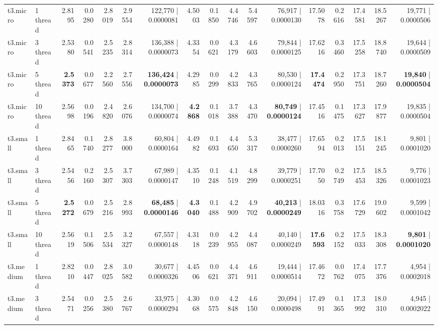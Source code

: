 \documentclass[conference]{IEEEtran}
\begin{document}
\begin{table}[h]
{\begin{tabular}{ll|rrrrr|rrrrr|rrrrr}
			\midrule
			t3.micro & 1 thread & 2.8195 & 0.0280 & 2.8019 & 2.9554 & 122,770 | 0.0000081 & 4.5003 & 0.1850 & 4.4746 & 5.4597 & 76,917 | 0.0000130 & 17.5078 & 0.2616 & 17.4581 & 18.5267 & 19,771 | 0.0000506 \\
			t3.micro & 3 thread & 2.5380 & 0.0541 & 2.5235 & 2.8314 & 136,388 | 0.0000073 & 4.3354 & 0.0621 & 4.3179 & 4.6603 & 79,844 | 0.0000125 & 17.6216 & 0.3460 & 17.5258 & 18.8740 & 19,644 | 0.0000509 \\
			t3.micro & 5 thread & \textbf{2.5373} & 0.0677 & 2.2560 & 2.7556 & \textbf{136,424} | \textbf{0.0000073} & 4.2985 & 0.0299 & 4.2833 & 4.3765 & 80,530 | 0.0000124 & \textbf{17.4474} & 0.2950 & 17.3751 & 18.7260 & \textbf{19,840} | \textbf{0.0000504} \\
			t3.micro & 10 thread & 2.5698 & 0.0196 & 2.4820 & 2.6076 & 134,700 | 0.0000074 & \textbf{4.2868} & 0.1018 & 3.7388 & 4.3470 & \textbf{80,749} | \textbf{0.0000124} & 17.4516 & 0.1475 & 17.3627 & 17.9877 & 19,835 | 0.0000504 \\
			\midrule
			t3.small & 1 thread & 2.8465 & 0.1740 & 2.8277 & 3.8000 & 60,804 | 0.0000164 & 4.4982 & 0.1693 & 4.4650 & 5.3317 & 38,477 | 0.0000260 & 17.6594 & 0.2013 & 17.5151 & 18.1245 & 9,801 | 0.0001020 \\
			t3.small & 3 thread & 2.5456 & 0.2160 & 2.5307 & 3.7303 & 67,989 | 0.0000147 & 4.3510 & 0.1248 & 4.1519 & 4.8299 & 39,779 | 0.0000251 & 17.7050 & 0.2749 & 17.5453 & 18.5326 & 9,776 | 0.0001023 \\
			t3.small & 5 thread & \textbf{2.5272} & 0.0679 & 2.5216 & 2.8993 & \textbf{68,485} | \textbf{0.0000146} & \textbf{4.3040} & 0.1488 & 4.2909 & 4.9702 & \textbf{40,213} | \textbf{0.0000249} & 18.0316 & 0.3758 & 17.6729 & 19.0602 & 9,599 | 0.0001042 \\
			t3.small & 10 thread & 2.5619 & 0.1506 & 2.5534 & 3.2327 & 67,557 | 0.0000148 & 4.3118 & 0.0239 & 4.2955 & 4.4087 & 40,140 | 0.0000249 & \textbf{17.6593} & 0.2152 & 17.5033 & 18.3308 & \textbf{9,801} | \textbf{0.0001020} \\
			\midrule
			t3.medium & 1 thread & 2.8210 & 0.0447 & 2.8025 & 3.0582 & 30,677 | 0.0000326 & 4.4506 & 0.0621 & 4.4371 & 4.6911 & 19,444 | 0.0000514 & 17.4672 & 0.0762 & 17.4075 & 17.7376 & 4,954 | 0.0002018 \\
			t3.medium & 3 thread & 2.5471 & 0.0256 & 2.5380 & 2.6767 & 33,975 | 0.0000294 & 4.3068 & 0.0575 & 4.2848 & 4.6150 & 20,094 | 0.0000498 & 17.4991 & 0.1365 & 17.3992 & 18.0310 & 4,945 | 0.0002022 \\

\end{tabular}}
\end{table}
\end{document}
